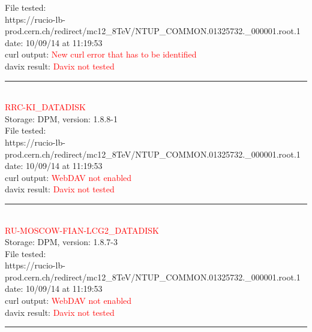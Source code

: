 File tested:\\
\footnotesize{https://rucio-lb-prod.cern.ch/redirect/mc12\_8TeV/NTUP\_COMMON.01325732.\_000001.root.1}\\

date: 10/09/14 at 11:19:53\\

curl output:  \textcolor{red}{New curl error that has to be identified}\\

davix result:  \textcolor{red}{Davix not tested}\\

\rule{\textwidth}{1pt}\\

\textcolor{red}{\normalsize{RRC-KI\_DATADISK}}\\

Storage: DPM, version: 1.8.8-1\\

File tested:\\
\footnotesize{https://rucio-lb-prod.cern.ch/redirect/mc12\_8TeV/NTUP\_COMMON.01325732.\_000001.root.1}\\

date: 10/09/14 at 11:19:53\\

curl output:  \textcolor{red}{WebDAV not enabled}\\

davix result:  \textcolor{red}{Davix not tested}\\

\rule{\textwidth}{1pt}\\

\textcolor{red}{\normalsize{RU-MOSCOW-FIAN-LCG2\_DATADISK}}\\

Storage: DPM, version: 1.8.7-3\\

File tested:\\
\footnotesize{https://rucio-lb-prod.cern.ch/redirect/mc12\_8TeV/NTUP\_COMMON.01325732.\_000001.root.1}\\

date: 10/09/14 at 11:19:53\\

curl output:  \textcolor{red}{WebDAV not enabled}\\

davix result:  \textcolor{red}{Davix not tested}\\

\rule{\textwidth}{1pt}\\

